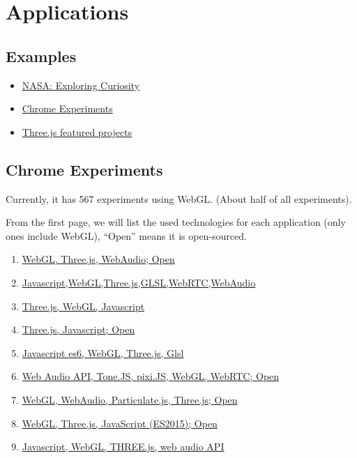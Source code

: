 \section{Applications}\label{applications}

\subsection{Examples}\label{examples}

\begin{itemize}
\tightlist
\item
  \href{http://eyes.nasa.gov/curiosity/}{NASA: Exploring Curiosity}
\item
  \href{https://www.chromeexperiments.com}{Chrome Experiments}
\item
  \href{http://threejs.org}{Three.js featured projects}
\end{itemize}

\subsection{Chrome Experiments}\label{chrome-experiments}

Currently, it has 567 experiments using WebGL. (About half of all
experiments).

From the first page, we will list the used technologies for each
application (only ones include WebGL), ``Open'' means it is
open-sourced.

\begin{enumerate}
\def\labelenumi{\arabic{enumi}.}
\tightlist
\item
  \href{https://www.chromeexperiments.com/experiment/lines}{WebGL,
  Three.js, WebAudio; Open}
\item
  \href{https://www.chromeexperiments.com/experiment/gaze}{Javascript,WebGL,Three.js,GLSL,WebRTC,WebAudio}
\item
  \href{https://www.chromeexperiments.com/experiment/world}{Three.js,
  WebGL, Javascript}
\item
  \href{https://www.chromeexperiments.com/experiment/infinite-city}{Three.js,
  Javascript; Open}
\item
  \href{https://www.chromeexperiments.com/experiment/amalgame}{Javascript
  es6, WebGL, Three.js, Glsl}
\item
  \href{https://www.chromeexperiments.com/experiment/music-lab}{Web
  Audio API, Tone.JS, pixi.JS, WebGL, WebRTC; Open}
\item
  \href{https://www.chromeexperiments.com/experiment/medusae}{WebGL,
  WebAudio, Particulate.js, Three.js; Open}
\item
  \href{https://www.chromeexperiments.com/experiment/4dvj}{WebGL,
  Three.js, JavaScript (ES2015); Open}
\item
  \href{https://www.chromeexperiments.com/experiment/one-million-stars}{Javascript,
  WebGL, THREE.js, web audio API}
\end{enumerate}

